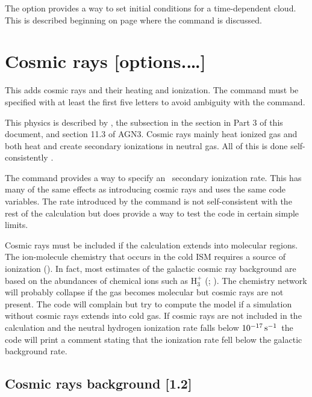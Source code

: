 The  option provides a way to set initial conditions
for a time-dependent cloud.
This is described beginning on page 
\pageref{sec:TimeVariableRadiationFields}
where the  command is discussed.

\section{Cosmic rays [options.\dots]}

This adds cosmic rays and their heating and ionization.  
The command must be specified with at least the first five letters 
to avoid ambiguity with the  command.

This physics
is described by \citet{FerlandMushotzky1984},
the subsection  in the section 
 in Part 3 of this
document, and section 11.3 of AGN3.
Cosmic rays mainly heat ionized gas
and both heat and create secondary ionizations in neutral gas.
All of this
is done self-consistently \citep{Dalgarno1999}.

The  command provides a way to
specify an \hO\ secondary ionization rate.
This has many of the same effects
as introducing cosmic rays and uses the same code variables.
The rate
introduced by the  command is not
self-consistent with the rest of the calculation but does
provide a way to test the code in certain simple limits.

Cosmic rays must be included if the calculation extends into molecular
regions.
The ion-molecule chemistry that occurs in the cold ISM requires
a source of ionization (\citealp{Dyson1997}).
In fact, most estimates
of the galactic cosmic ray background are based
on the abundances of chemical
ions such as H$_{3}^{+}$ (\citealp{McCall2003}; \citealp{Shaw2008}).
The chemistry
network will probably collapse if the gas becomes molecular
but cosmic rays
are not present.
The code will complain but try to compute the model if
a simulation without cosmic rays extends into cold gas.
If cosmic rays
are not included in the calculation and the neutral hydrogen ionization
rate falls below $10^{-17} \mbox{${\rm\thinspace s}^{-1}\,$}$
the code will print a comment stating that the
ionization rate fell below the galactic background rate.

\subsection{Cosmic rays background [1.2]}


